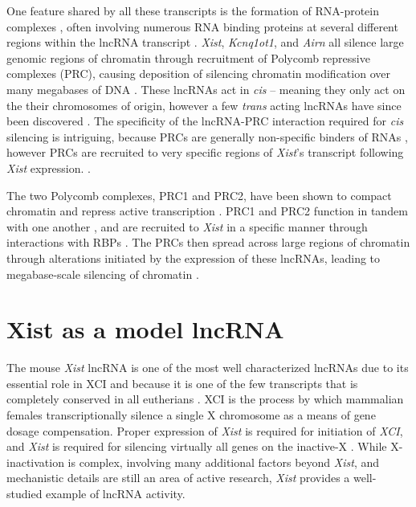 One feature shared by all these transcripts is the formation of RNA-protein complexes \cite{Schertzer2019LncRNA-InducedDNA}, often involving numerous RNA binding proteins at several different regions within the lncRNA transcript \cite{Brockdorff2018LocalNcRNA,Nesterova2001CharacterizationSequence,Sprague2019NonlinearDomains,Pintacuda2017HnRNPKSilencing}.  \emph{Xist}, \emph{Kcnq1ot1}, and \emph{Airn} all silence large genomic regions of chromatin through recruitment of Polycomb repressive complexes (PRC), causing deposition of silencing chromatin modification over many megabases of DNA \cite{Schertzer2019LncRNA-InducedDNA}. These lncRNAs act in \emph{cis} -- meaning they only act on the their chromosomes of origin, however a few \emph{trans} acting lncRNAs have since been discovered \cite{Hacisuleyman2016FunctionLocus,Somarowthu2015HOTAIRStructure}. The specificity of the lncRNA-PRC interaction required for \emph{cis} silencing is intriguing, because PRCs are generally non-specific binders of RNAs \cite{Davidovich2015TowardRNA,Cifuentes-Rojas2014Regulatory2}, however PRCs are recruited to very specific regions of \emph{Xist}'s transcript following \emph{Xist} expression. \cite{Pintacuda2017HnRNPKSilencing,Wang2017TargetingGuanines,Zhao2008PolycombChromosome}.

The two Polycomb complexes, PRC1 and PRC2, have been shown to compact chromatin and repress active transcription \cite{Simon2009MechanismsUnknowns,Leeb2010PolycombGenes,Schertzer2019LncRNA-InducedDNA}. PRC1 and PRC2 function in tandem with one another \cite{Leeb2010PolycombGenes,Schertzer2019LncRNA-InducedDNA}, and are recruited to \emph{Xist} in a specific manner through interactions with RBPs \cite{Almeida2017PCGF3/5-PRC1Inactivation,Pintacuda2017HnRNPKSilencing}. The PRCs then spread across large regions of chromatin through alterations initiated by the expression of these lncRNAs, leading to megabase-scale silencing of chromatin \cite{Schertzer2019LncRNA-InducedDNA}. 

\section{Xist as a model lncRNA}
The mouse \textit{Xist} lncRNA is one of the most well characterized lncRNAs due to its essential role in XCI and because it is one of the few transcripts that is completely conserved in all eutherians \cite{Brown10TheNucleus.,Brockdorff10TheNucleus.,Sprague2019NonlinearDomains,Kirk2018FunctionalContent}. XCI is the process by which mammalian females transcriptionally silence a single X chromosome as a means of gene dosage compensation. Proper expression of \textit{Xist} is required for initiation of \textit{XCI}, and \textit{Xist} is required for silencing virtually all genes on the inactive-X \cite{Brown10TheNucleus.,Brockdorff10TheNucleus.,Hoki2009AMouse}. While X-inactivation is complex, involving many additional factors beyond \textit{Xist}, and mechanistic details are still an area of active research, \textit{Xist} provides a well-studied example of lncRNA activity.



